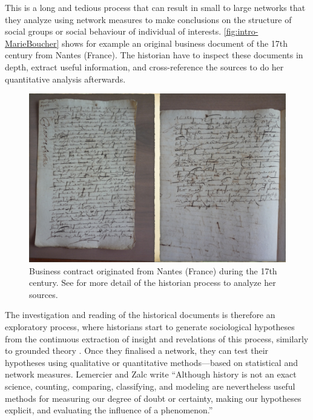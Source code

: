 This is a long and tedious process that can result in small to large networks that they analyze using network measures to make conclusions on the structure of social groups or social behaviour of individual of interests.
\autoref{fig:intro-MarieBoucher} shows for example an original business document of the 17th century from Nantes (France).
The historian have to inspect these documents in depth, extract useful information, and cross-reference the sources to do her quantitative analysis afterwards.
\begin{figure}[!ht]
    \centering %
    \includegraphics[width=1\textwidth]{static/figures/MarieBoucher-70}
    \caption{Business contract originated from Nantes (France) during the 17th century. See \cite{dufournaudCommentRendreVisible2018} for more detail of the historian process to analyze her sources.}
    \label{fig:intro-MarieBoucher}
\end{figure}
The investigation and reading of the historical documents is therefore an exploratory process, where historians start to generate sociological hypotheses from the continuous extraction of insight and revelations of this process, similarly to grounded theory \cite{glaserDiscoveryGroundedTheory2010}.
Once they finalised a network, they can test their hypotheses using qualitative or quantitative methods---based on statistical and network measures.
Lemercier and Zalc write ``Although history is not an exact science, counting, comparing, classifying, and modeling are nevertheless useful methods for measuring our degree of doubt or certainty, making our hypotheses explicit, and evaluating the influence of a phenomenon.''\cite{lemercierQuantitativeMethodsHumanities2019}

